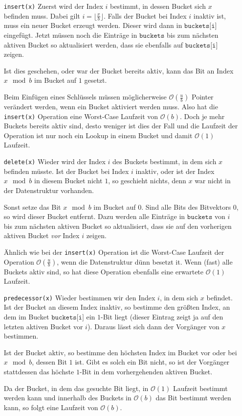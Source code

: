 \begin{itemize}[leftmargin=3cm]
    \item[\texttt{insert(x)}] 
    Zuerst wird der Index $i$ bestimmt, in dessen Bucket sich $x$ befinden muss. Dabei gilt $i = \lfloor \tfrac{x}{b} \rfloor$. Falls der Bucket bei Index $i$ inaktiv ist, muss ein neuer Bucket erzeugt werden. Dieser wird dann in $\texttt{buckets[i]}$ eingefügt.
    Jetzt müssen noch die Einträge in $\texttt{buckets}$ bis zum nächsten aktiven Bucket so aktualisiert werden, dass sie ebenfalls auf $\texttt{buckets[i]}$ zeigen.
    
    Ist dies geschehen, oder war der Bucket bereits aktiv, kann das Bit an Index $x \mod b$ im Bucket auf $1$ gesetzt.
    
    Beim Einfügen eines Schlüssels müssen möglicherweise $\mathcal{O}(\tfrac{u}{b})$ Pointer verändert werden, wenn ein Bucket aktiviert werden muss. Also hat die \texttt{insert(x)} Operation eine Worst-Case Laufzeit von $\mathcal{O}(b)$. Doch je mehr Buckets bereits aktiv sind, desto weniger ist dies der Fall und die Laufzeit der Operation ist nur noch ein Lookup in einem Bucket und damit $\mathcal{O}(1)$ Laufzeit.

    \item[\texttt{delete(x)}]
    Wieder wird der Index $i$ des Buckets bestimmt, in dem sich $x$ befinden müsste. Ist der Bucket bei Index $i$ inaktiv, oder ist der Index $x \mod b$ in diesem Bucket nicht $1$, so geschieht nichts, denn $x$ war nicht in der Datenstruktur vorhanden.

    Sonst setze das Bit $x \mod b$ im Bucket auf $0$. Sind alle Bits des Bitvektors $0$, so wird dieser Bucket entfernt. Dazu werden alle Einträge in $\texttt{buckets}$ von $i$ bis zum nächsten aktiven Bucket so aktualisiert, dass sie auf den vorherigen aktiven Bucket \textit{vor} Index $i$ zeigen.

    Ähnlich wie bei der \texttt{insert(x)} Operation ist die Worst-Case Laufzeit der Operation $\mathcal{O}(\tfrac{u}{b})$, wenn die Datenstruktur dünn besetzt it. Wenn (fast) alle Buckets aktiv sind, so hat diese Operation ebenfalls eine erwartete $\mathcal{O}(1)$ Laufzeit.

    \item[\texttt{predecessor(x)}]
    Wieder bestimmen wir den Index $i$, in dem sich $x$ befindet. Ist der Bucket an diesem Index inaktiv, so bestimme den größten Index, an dem im Bucket $\texttt{buckets[i]}$ ein $1$-Bit liegt (dieser Eintrag zeigt ja auf den letzten aktiven Bucket vor $i$). Daraus lässt sich dann der Vorgänger von $x$ bestimmen.

    Ist der Bucket aktiv, so bestimme den höchsten Index im Bucket vor oder bei $x \mod b$, dessen Bit $1$ ist. Gibt es solch ein Bit nicht, so ist der Vorgänger stattdessen das höchste $1$-Bit in dem vorhergehenden aktiven Bucket.

    Da der Bucket, in dem das gesuchte Bit liegt, in $\mathcal{O}(1)$ Laufzeit bestimmt werden kann und innerhalb des Buckets in $\mathcal{O}(b)$ das Bit bestimmt werden kann, so folgt eine Laufzeit von $\mathcal{O}(b)$.
\end{itemize}

